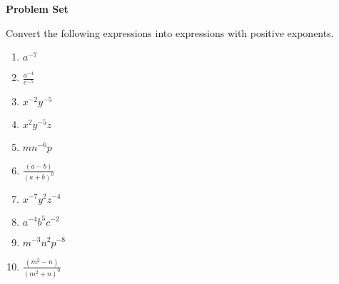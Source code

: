 \textbf{Problem Set}

\vspce

Convert the following expressions into expressions with positive exponents.
  
\begin{enumerate}[label = \arabic*. ]

\item \hspce $a^{-7}$
\item \hspce $\displaystyle \frac{a^{-4}}{e^{-5}}$
\item \hspce $x^{-2}y^{-5}$
\item \hspce $x^{2}y^{-5}z$
\item \hspce $mn^{-6}p$
\item \hspce $\displaystyle \frac{(a-b)}{(a+b)^{0}}$
\item \hspce $x^{-7}y^{2}z^{-4}$
\item \hspce $a^{-4}b^{5}c^{-2}$
\item \hspce $m^{-3}n^2p^{-8}$
\item \hspce $\displaystyle \frac{(m^2-n)}{(m^2+n)^{0}}$
\end{enumerate}